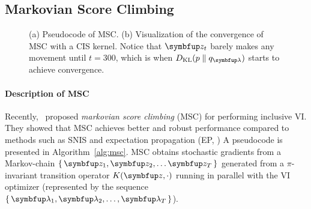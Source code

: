 \subsection{Markovian Score Climbing}\label{section:msc}
%
\begin{figure}[H]
  \vspace{-0.01in}
  \small
  \centering
  \subfloat[]{
      \label{fig:motivating}
  }
  \caption{(a) Pseudocode of MSC. (b) Visualization of the convergence of MSC with a CIS kernel.
    Notice that \(\vz_t\) barely makes any movement until \(t=300\), which is when \(\DKL{p}{q_{\vlambda}}\) starts to achieve convergence.}
\end{figure}
%
%
\paragraph{Description of MSC}
Recently,~\citet{NEURIPS2020_b2070693} proposed \textit{markovian score climbing} (MSC) for performing inclusive VI.
They showed that MSC achieves better and robust performance compared to methods such as SNIS and expectation propagation (EP, \citealt{10.5555/2074022.2074067})
A pseudocode is presented in Algorithm~\ref{alg:msc}.
MSC obtains stochastic gradients from a Markov-chain \(\{\,\vz_1, \vz_2, \ldots \vz_T\,\}\) generated from a \(\pi\)-invariant transition operator \(K(\vz, \cdot)\) running in parallel with the VI optimizer (represented by the sequence \(\{\,\vlambda_1, \vlambda_2, \ldots, \vlambda_T\,\}\)).

